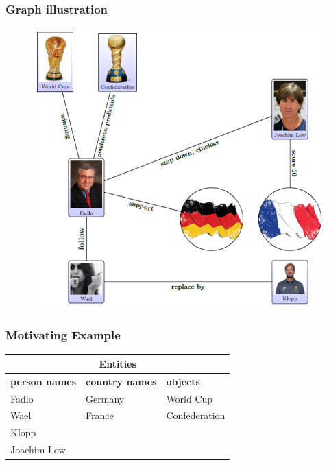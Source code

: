 \documentclass[xcolor=table]{beamer}
\begin{document}

\begin{frame}
\frametitle{Graph illustration}
\begin{figure}[!htb]
   \centering
    \includegraphics[scale=0.4]{img0008.png}
    
\end{figure}

\end{frame}
\begin{frame}
\frametitle{Motivating Example}

\begin{table}[]
\begin{tabular}{|l|l|l|}
\hline
\multicolumn{3}{|c|}{\cellcolor[HTML]{C0C0C0}\textbf{Entities}}   \\ \hline
\textbf{person names} & \textbf{country names} & \textbf{objects} \\ \hline
Fadlo                 & Germany                & World Cup        \\ \hline
Wael                  & France                 & Confederation    \\ \hline
Klopp                 &                        &                  \\ \hline
Joachim Low           &                        &                  \\ \hline
\end{tabular}
\end{table}

\end{frame}
\end{document}
